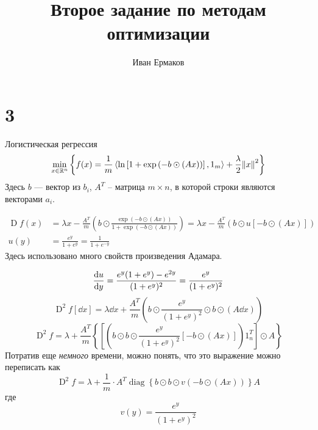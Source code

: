 \documentclass[notitlepage]{article}
\title{Второе задание по методам оптимизации}
\author{Иван Ермаков}
\date{}
\newcommand\inner[2]{\left\langle #1, #2 \right\rangle}
\begin{document}
\maketitle
\section*{3}
Логистическая регрессия
\begin{equation}
  \min_{x \in \mathbb{R}^n} \left\{f(x) = \frac 1m\inner{\ln\left[1 + \exp\left(-b \odot \left(A x\right)\right)\right]}{1_m}
  + \frac{\lambda}2 \norm{x}^2\right\}
\end{equation}
Здесь $b$ --- вектор из $b_i$, $A^T$ -- матрица $m \times n$, в которой строки являются векторами $a_i$.

\begin{equation}
  \begin{aligned}
    \operatorname{D} f(x) &= \lambda x - \frac {A^T} m\left(b\odot\frac{\exp\left(-b \odot \left(A x\right)\right)}
  {1 + \exp\left(-b \odot \left(A x\right)\right)}\right) = 
  \lambda x - \frac {A^T} m\left(b\odot u\left[-b\odot \left(A x\right)\right]\right)\\
  u(y) &= \frac{e^y}{1 + e^y} = \frac1{1 + e^{-y}}
  \end{aligned}
\end{equation}
Здесь использовано много свойств произведения Адамара.

\begin{equation}
    \dv{u}{y} = \frac{e^y(1 + e^y) - e^{2y}}{(1 + e^y)^2} = \frac{e^y}{(1 + e^y)^2}\\
    \end{equation}
\begin{equation}
  \operatorname{D}^2 f[\dd x] = \lambda \dd x + \frac {A^T}m \left(b\odot \frac{e^y}{(1 + e^y)^2} \odot b \odot \left(A \dd x \right)\right)
    \end{equation}
\begin{equation}
  \operatorname{D}^2 f = 
  \lambda + \frac {A^T}m \left\{\left[\left(b \odot b \odot \frac{e^y}{(1 + e^y)^2}[-b \odot (Ax)]\right) 1_n^T\right] \odot A\right\}
\end{equation}
Потратив еще \textit{немного} времени, можно понять, что это выражение можно переписать как
\begin{equation}
  \operatorname{D}^2 f = \lambda + \frac 1m \cdot A^T \operatorname{diag}\left\{b\odot b \odot v(-b \odot \left(A x\right))\right\} A
\end{equation}
где
\begin{equation}
  v(y) = \frac{e^y}{(1 + e^y)^2}
\end{equation}
			
\end{document}
